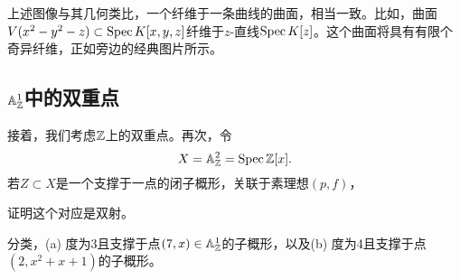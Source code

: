 
上述图像与其几何类比，一个纤维于一条曲线的曲面，相当一致。比如，曲面$V(x^2-y^2-z)\subset \operatorname{Spec} K[x,y,z]$纤维于$z$-直线$\operatorname{Spec} K[z]$。这个曲面将具有有限个奇异纤维，正如旁边的经典图片所示。\nottran

\subsection{$\mathbb{A}_{\mathbb{Z}}^1$中的双重点}

接着，我们考虑$\mathbb{Z}$上的双重点。再次，令
\[
	X=\mathbb{A}_{\mathbb{Z}}^2=\operatorname{Spec}\mathbb{Z}[x].
\]
若$Z\subset X$是一个支撑于一点的闭子概形，关联于素理想$(p,f)$，

\begin{exe}
证明这个对应是双射。
\end{exe}

\begin{exe}
分类，(a) 度为3且支撑于点$(7,x)\in\mathbb{A}_{\mathbb{Z}}^1$的子概形，以及(b) 度为4且支撑于点$(2,x^2+x+1)$的子概形。
\end{exe}

\begin{exe}
\nottran
\end{exe}